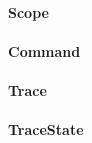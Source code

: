 \documentclass[parskip=full]{scrartcl}
\begin{document}
\paragraph{Scope}
\paragraph{Command}
\paragraph{Trace}
\paragraph{TraceState}
\end{document}
